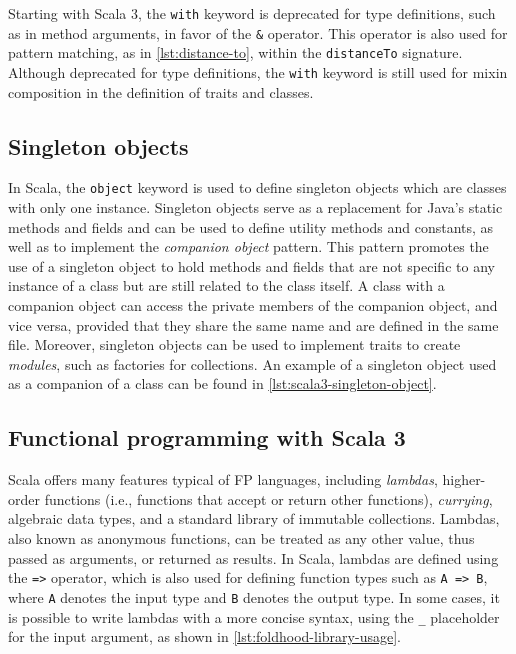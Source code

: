 Starting with Scala 3, the \texttt{with} keyword is deprecated for type definitions, such as in method arguments, in favor of the \texttt{\&} operator.
%
This operator is also used for pattern matching, as in \cref{lst:distance-to}, within the \texttt{distanceTo} signature.
%
Although deprecated for type definitions, the \texttt{with} keyword is still used for mixin composition in the definition of traits and classes.


\subsection{Singleton objects} \label{chap:background->sec:scala3->subsec:singleton-objects}

In Scala, the \texttt{object} keyword is used to define singleton objects which are classes with only one instance.
%
Singleton objects serve as a replacement for Java's static methods and fields and can be used to define utility methods and constants, as well as to implement the \textit{companion object} pattern.
%
This pattern promotes the use of a singleton object to hold methods and fields that are not specific to any instance of a class but are still related to the class itself.
%
A class with a companion object can access the private members of the companion object, and vice versa, provided that they share the same name and are defined in the same file.
%
Moreover, singleton objects can be used to implement traits to create \textit{modules}, such as factories for collections.
%
An example of a singleton object used as a companion of a class can be found in \cref{lst:scala3-singleton-object}.




\subsection{Functional programming with Scala 3} \label{chap:background->sec:scala3->subsec:functional-programming}

Scala offers many features typical of \ac{FP} languages, including \textit{lambdas}, higher-order functions (i.e., functions that accept or return other functions), \textit{currying}, algebraic data types, and a standard library of immutable collections.
%
Lambdas, also known as anonymous functions, can be treated as any other value, thus passed as arguments, or returned as results.
%
In Scala, lambdas are defined using the \texttt{=>} operator, which is also used for defining function types such as \texttt{A => B}, where \texttt{A} denotes the input type and \texttt{B} denotes the output type.
%
In some cases, it is possible to write lambdas with a more concise syntax, using the \texttt{\_} placeholder for the input argument, as shown in \cref{lst:foldhood-library-usage}.


